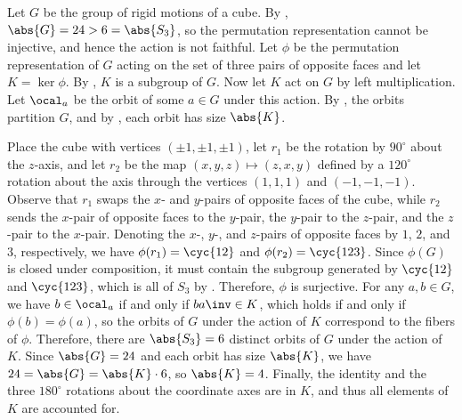 \begin{sol}
    Let $G$ be the group of rigid motions of a cube.
    By , $\abs{G} = 24 > 6 = \abs{S_3}$, so the permutation representation cannot be injective, and hence the action is not faithful.
    Let $\phi$ be the permutation representation of $G$ acting on the set of three pairs of opposite faces and let $K = \ker\phi$.
    By , $K$ is a subgroup of $G$.
    Now let $K$ act on $G$ by left multiplication.
    Let $\ocal_a$ be the orbit of some $a \in G$ under this action.
    By , the orbits partition $G$, and by , each orbit has size $\abs{K}$.

    Place the cube with vertices $(\pm 1, \pm 1, \pm 1)$, let $r_1$ be the rotation by $90^\circ$ about the $z$-axis, and let $r_2$ be the map $(x, y, z) \mapsto (z, x, y)$ defined by a $120^\circ$ rotation about the axis through the vertices $(1, 1, 1)$ and $(-1, -1, -1)$.
    Observe that $r_1$ swaps the $x$- and $y$-pairs of opposite faces of the cube, while $r_2$ sends the $x$-pair of opposite faces to the $y$-pair, the $y$-pair to the $z$-pair, and the $z$-pair to the $x$-pair.
    Denoting the $x$-, $y$-, and $z$-pairs of opposite faces by $1$, $2$, and $3$, respectively, we have $\phi(r_1) = \cyc{1 2}$ and $\phi(r_2) = \cyc{1 2 3}$.
    Since $\phi(G)$ is closed under composition, it must contain the subgroup generated by $\cyc{1 2}$ and $\cyc{1 2 3}$, which is all of $S_3$ by .
    Therefore, $\phi$ is surjective.
    For any $a, b \in G$, we have $b \in \ocal_a$ if and only if $ba\inv \in K$, which holds if and only if $\phi(b) = \phi(a)$, so the orbits of $G$ under the action of $K$ correspond to the fibers of $\phi$.
    Therefore, there are $\abs{S_3} = 6$ distinct orbits of $G$ under the action of $K$.
    Since $\abs{G} = 24$ and each orbit has size $\abs{K}$, we have $24 = \abs{G} = \abs{K} \cdot 6$, so $\abs{K} = 4$.
    Finally, the identity and the three $180^\circ$ rotations about the coordinate axes are in $K$, and thus all elements of $K$ are accounted for.
\end{sol}